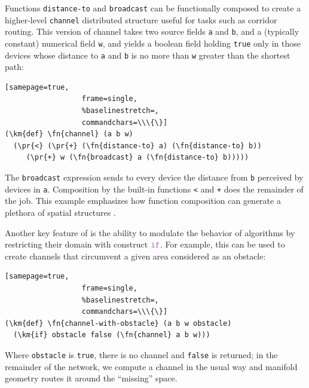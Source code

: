 \documentclass[12pt,a4paper,twoside,openright]{book}
\begin{document}
Functions \texttt{distance-to} and \texttt{broadcast} can be functionally composed to create a higher-level {\tt channel} distributed structure useful for tasks such as corridor routing.
%
This version of channel takes two source fields \texttt{a} and \texttt{b}, and a (typically constant) numerical field \texttt{w}, and yields a boolean field holding \texttt{true} only in those devices whose distance to \texttt{a} and \texttt{b} is no more than \texttt{w} greater than the shortest path:
%
\begin{Verbatim}[samepage=true,
                  frame=single,
                  %baselinestretch=,
                  commandchars=\\\{\}]
(\km{def} \fn{channel} (a b w)
  (\pr{<} (\pr{+} (\fn{distance-to} a) (\fn{distance-to} b))
     (\pr{+} w (\fn{broadcast} a (\fn{distance-to} b)))))
\end{Verbatim}
The {\tt broadcast} expression sends to every device the distance from {\tt b} perceived by devices in \texttt{a}.  Composition by the built-in functions \texttt{<} and \texttt{+} does the remainder of the job.
%
This example emphasizes how function composition can generate a plethora of spatial structures \cite{anticipativegradient-SASO12}.

Another key feature of \calculus{} is the ability to modulate the behavior of algorithms by restricting their domain with construct $\ifN$.
%
For example, this can be used to create channels that circumvent a given area considered as an obstacle:
%
\begin{Verbatim}[samepage=true,
                  frame=single,
                  %baselinestretch=,
                  commandchars=\\\{\}]
(\km{def} \fn{channel-with-obstacle} (a b w obstacle)
  (\km{if} obstacle false (\fn{channel} a b w)))
\end{Verbatim}
%
Where \texttt{obstacle} is \texttt{true}, there is no channel and \texttt{false} is returned; in the remainder of the network, we compute a channel in the usual way and manifold geometry routes it around the ``missing'' space.
\end{document}
